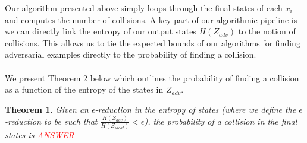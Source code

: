 \documentclass[letterpaper,twocolumn,10pt]{article}
\newtheorem{theorem}{Theorem}
\begin{document}
Our algorithm presented above simply loops through the final states of each $x_{i}$ and computes the number of collisions. A key part of our algorithmic pipeline is we can directly link the entropy of our output states $H(Z_{adv})$ to the notion of collisions. This allows us to tie the expected bounds of our algorithms for finding adversarial examples directly to the probability of finding a collision.  
\\
\\
We present Theorem 2 below which outlines the probability of finding a collision as a function of the entropy of the states in  $Z_{adv}$.


\begin{theorem}
Given an $\epsilon$-reduction in the entropy of states (where we define the $\epsilon$-reduction to be such that $\frac{H(Z_{adv})}{H(Z_{ideal})} < \epsilon$), the probability of a collision in the final states is \textcolor{red}{ANSWER}
\end{theorem}
\end{document}
